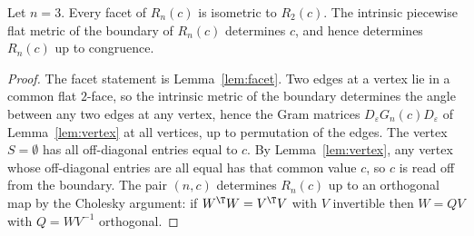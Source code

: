 \begin{theorem}\label{thm:main}
Let $n=3$. Every facet of $R_n(c)$ is isometric to $R_{2}(c)$.
The intrinsic piecewise flat metric of the boundary of $R_n(c)$ determines $c$, and hence determines $R_n(c)$ up to congruence.
\end{theorem}
\begin{proof}
The facet statement is Lemma~\ref{lem:facet}.
Two edges at a vertex lie in a common flat $2$-face, so the intrinsic metric of the boundary determines the angle between any two edges at any vertex, hence the Gram matrices $D_\varepsilon G_n(c)D_\varepsilon$ of Lemma~\ref{lem:vertex} at all vertices, up to permutation of the edges. The vertex $S=\emptyset$ has all off-diagonal entries equal to $c$. By Lemma~\ref{lem:vertex}, any vertex whose off-diagonal entries are all equal has that common value $c$, so $c$ is read off from the boundary. The pair $(n,c)$ determines $R_n(c)$ up to an orthogonal map by the Cholesky argument: if $W^\T W=V^\T V$ with $V$ invertible then $W=QV$ with $Q=WV^{-1}$ orthogonal.
\end{proof}
